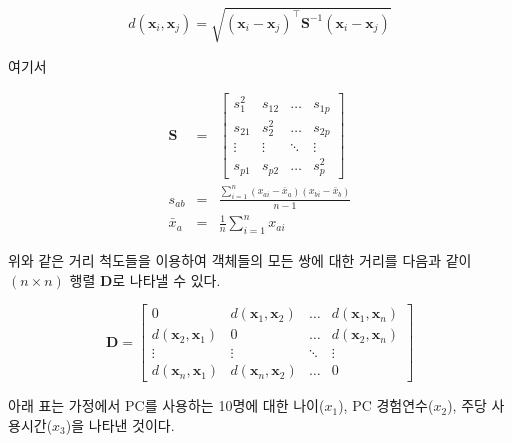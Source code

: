\documentclass[]{book}
\begin{document}
\begin{equation*}
d(\mathbf{x}_i, \mathbf{x}_j) = \sqrt{(\mathbf{x}_i - \mathbf{x}_j)^\top \mathbf{S}^{-1} (\mathbf{x}_i - \mathbf{x}_j)}
\end{equation*}

여기서

\begin{eqnarray*}
\mathbf{S} &=& \begin{bmatrix}
s_1^2 & s_{12} & \dots & s_{1p}\\
s_{21} & s_2^2 & \dots & s_{2p}\\
\vdots & \vdots & \ddots & \vdots\\
s_{p1} & s_{p2} & \dots & s_p^2
\end{bmatrix}\\
s_{ab} &=& \frac{\sum_{i = 1}^{n} (x_{ai} - \bar{x}_a)(x_{bi} - \bar{x}_b)}{n - 1}\\
\bar{x}_a &=& \frac{1}{n} \sum_{i = 1}^{n} x_{ai}
\end{eqnarray*}

위와 같은 거리 척도들을 이용하여 객체들의 모든 쌍에 대한 거리를 다음과 같이 \((n \times n)\) 행렬 \(\mathbf{D}\)로 나타낼 수 있다.

\begin{equation*}
\mathbf{D} = \begin{bmatrix}
0 & d(\mathbf{x}_1, \mathbf{x}_2) & \dots & d(\mathbf{x}_1, \mathbf{x}_n)\\
d(\mathbf{x}_2, \mathbf{x}_1) & 0 & \dots & d(\mathbf{x}_2, \mathbf{x}_n)\\
\vdots & \vdots & \ddots & \vdots \\
d(\mathbf{x}_n, \mathbf{x}_1) & d(\mathbf{x}_n, \mathbf{x}_2) & \dots & 0
\end{bmatrix}
\end{equation*}

아래 표는 가정에서 PC를 사용하는 10명에 대한 나이(\(x_1\)), PC 경험연수(\(x_2\)), 주당 사용시간(\(x_3\))을 나타낸 것이다.
\end{document}
